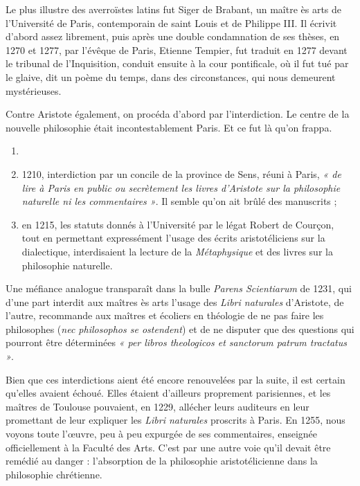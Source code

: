 \documentclass[french,twoside]{book} %
\begin{document}
\begin{listalpha}[itemsep=\baselineskip,]
\item Le plus illustre des averroïstes latins fut Siger de Brabant, un maître ès arts de l’Université de Paris, contemporain de saint Louis et de Philippe III. Il écrivit d’abord assez librement, puis après une double condamnation de ses thèses, en 1270 et 1277, par l’évêque de Paris, Etienne Tempier, fut traduit en 1277 devant le tribunal de l’Inquisition, conduit ensuite à la cour pontificale, où il fut tué par le glaive, dit un poème du temps, dans des circonstances, qui nous demeurent mystérieuses.
\label{p120}\item Contre Aristote également, on procéda d’abord par l’interdiction. Le centre de la nouvelle philosophie était incontestablement Paris. Et ce fut là qu’on frappa.\par

\begin{enumerate}[itemsep=0pt,]
\item[] \hspace{-1.5em}{\bfseries Une série de mesures se suivent :}
\item  1210, interdiction par un concile de la province de Sens, réuni à Paris, \emph{« de lire à Paris en public ou secrètement les livres d’Aristote sur la philosophie naturelle ni les commentaires »}. Il semble qu’on ait brûlé des manuscrits ;
\item en 1215, les statuts donnés à l’Université par le légat Robert de Courçon, tout en permettant expressément l’usage des écrits aristotéliciens sur la dialectique, interdisaient la lecture de la {\itshape Métaphysique} et des livres sur la philosophie naturelle.

\end{enumerate}Une méfiance analogue transparaît dans la bulle {\itshape Parens Scientiarum} de 1231, qui d’une part interdit aux maîtres ès arts l’usage des {\itshape Libri naturales} d’Aristote, de l’autre, recommande aux maîtres et écoliers en théologie de ne pas faire les philosophes ({\itshape nec philosophos se ostendent}) et de ne disputer que des questions qui pourront être déterminées \emph{« per libros theologicos et sanctorum patrum tractatus »}.


\end{listalpha}\noindent Bien que ces interdictions aient été encore renouvelées par la suite, il est certain qu’elles avaient échoué. Elles étaient d’ailleurs proprement parisiennes, et les maîtres de Toulouse pouvaient, en 1229, allécher leurs auditeurs en leur promettant de leur expliquer les {\itshape Libri naturales} proscrits à Paris. En 1255, nous voyons toute l’œuvre, peu à peu expurgée de ses commentaires, enseignée officiellement à la Faculté des Arts. C’est par une autre voie qu’il devait être remédié au danger : l’absorption de la philosophie aristotélicienne dans la philosophie chrétienne.\par
\end{document}
